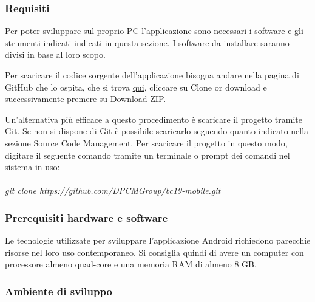 \subsubsection{Requisiti}
Per poter sviluppare sul proprio PC l'applicazione sono necessari i software e gli strumenti indicati indicati in questa sezione. I software da installare saranno divisi in base al loro scopo.

Per scaricare il codice sorgente dell'applicazione bisogna andare nella pagina di GitHub che lo ospita, che si trova \href{https://github.com/DPCMGroup/bc19-mobile}{qui}, cliccare su Clone or download e successivamente premere su Download ZIP.

Un'alternativa più efficace a questo procedimento è scaricare il progetto tramite Git. Se non si dispone di Git è possibile scaricarlo seguendo quanto indicato nella sezione Source Code Management. Per scaricare il progetto in questo modo, digitare il seguente comando tramite un terminale o prompt dei comandi nel sistema in uso:\\ \\
\textit{git clone https://github.com/DPCMGroup/bc19-mobile.git}

\subsubsection{Prerequisiti hardware e software}
Le tecnologie utilizzate per sviluppare l'applicazione Android richiedono parecchie risorse nel loro uso contemporaneo. Si consiglia quindi di avere un computer con processore almeno quad-core e una memoria RAM di almeno 8 GB.

\subsubsection{Ambiente di sviluppo}

